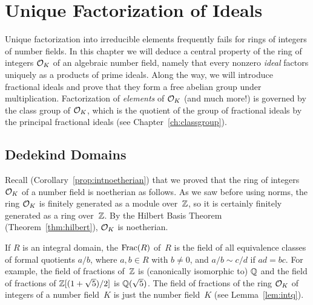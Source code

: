 \chapter{Unique Factorization of Ideals}

Unique factorization into irreducible elements frequently fails for
rings of integers of number fields.  In this chapter we will deduce a
central property of the ring of integers $\mathcal{O}_K$ of an algebraic number
field, namely that every nonzero {\em ideal} factors uniquely as a
products of prime ideals.  Along the way, we will introduce fractional
ideals and prove that they form a free abelian group under
multiplication.  Factorization of {\em elements} of $\mathcal{O}_K$ (and much
more!) is governed by the class group of $\mathcal{O}_K$, which is the quotient
of the group of fractional ideals by the principal fractional ideals
(see Chapter~\ref{ch:classgroup}).

\section{Dedekind Domains}

Recall (Corollary~\ref{prop:intnoetherian}) that we proved that the
ring of integers $\mathcal{O}_K$ of a number field is noetherian as follows.
As we saw before using norms, the ring $\mathcal{O}_K$ is finitely generated as
a module over~$\mathbb{Z}$, so it is certainly finitely generated as a ring
over~$\mathbb{Z}$.  By the Hilbert Basis Theorem (Theorem~\ref{thm:hilbert}),
$\mathcal{O}_K$ is noetherian.

If $R$ is an integral domain, the  $\operatorname{Frac}(R)$
of~$R$ is the field of all equivalence classes of formal quotients
$a/b$, where $a,b \in R$ with $b\neq 0$, and $a/b\sim c/d$ if $ad=bc$.
For example, the field of fractions of~$\mathbb{Z}$ is (canonically isomorphic
to) $\mathbb{Q}$ and the field of fractions of $\mathbb{Z}[(1+\sqrt{5})/2]$ is
$\mathbb{Q}(\sqrt{5})$.  The field of fractions of the ring $\mathcal{O}_K$ of integers
of a number field~$K$ is just the number field~$K$ (see Lemma~\ref{lem:intq}).

